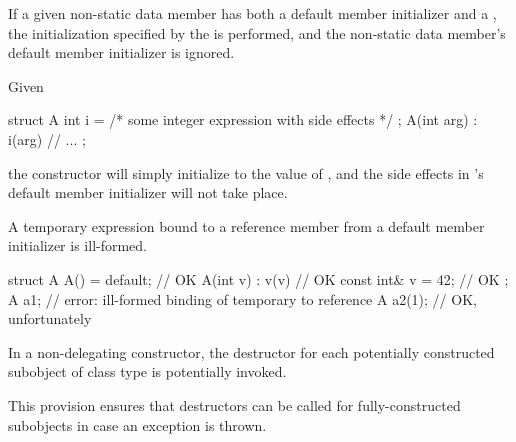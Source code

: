 \pnum
If a given non-static data member has both a default member initializer
and a , the initialization specified by the
 is performed, and the non-static data member's
default member initializer is ignored.
\begin{example} Given
\begin{codeblock}
struct A {
  int i = /* some integer expression with side effects */ ;
  A(int arg) : i(arg) { }
  // ...
};
\end{codeblock}

the  constructor will simply initialize  to the value of
, and the
%
side effects in 's default member initializer
will not take place.
\end{example}

\pnum
A temporary expression bound to a reference member from a
default member initializer is ill-formed.
\begin{example}
\begin{codeblock}
struct A {
  A() = default;        // OK
  A(int v) : v(v) { }   // OK
  const int& v = 42;    // OK
};
A a1;                   // error: ill-formed binding of temporary to reference
A a2(1);                // OK, unfortunately
\end{codeblock}
\end{example}

\pnum
In a non-delegating constructor, the destructor for each potentially constructed
subobject of class type is potentially invoked.
\begin{note} This provision ensures that destructors can be called for fully-constructed
subobjects in case an exception is thrown. \end{note}

